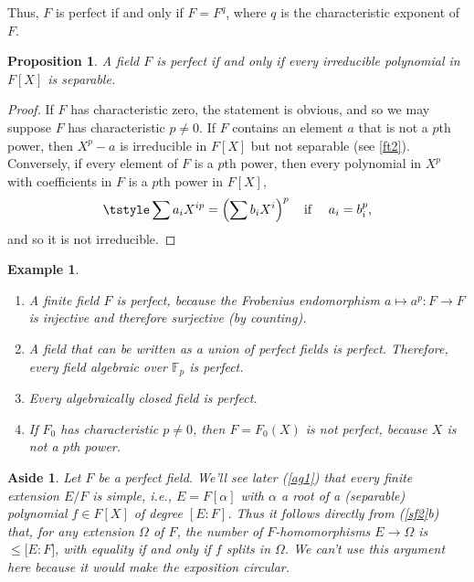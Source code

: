 \documentclass[a4paper,11pt,final,openany]{memoir}
\newtheorem{proposition}[X]{Proposition}
\newtheorem{example}[X]{Example}
\newtheorem{aside}[X]{Aside}
\theoremstyle{nonumberplain}
\newtheorem{proof}{Proof.}
\begin{document}
Thus, $F$ is perfect if and only if $F=F^{q}$, where $q$ is the characteristic
exponent of $F$.

\begin{proposition}
\label{ft5}A field $F$ is perfect if and only if every irreducible polynomial
in $F[X]$ is separable.
\end{proposition}

\begin{proof}
If $F$ has characteristic zero, the statement is obvious, and so we may
suppose $F$ has characteristic $p\neq0$. If $F$ contains an element $a$ that
is not a $p$th power, then $X^{p}-a$ is irreducible in $F[X]$ but not
separable (see \ref{ft2}). Conversely, if every element of $F$ is a $p$th
power, then every polynomial in $X^{p}$ with coefficients in $F$ is a $p$th
power in $F[X]$,%
\[
\tstyle\sum a_{i}X^{ip}=\left(  \sum b_{i}X^{i}\right)  ^{p}\quad\text{if
}\quad a_{i}=b_{i}^{p}\text{,}%
\]
and so it is not irreducible.
\end{proof}

\begin{example}
\label{ft6}

\begin{enumerate}
\item A finite field $F$ is perfect, because the Frobenius endomorphism%
$a\mapsto a^{p}\colon F\rightarrow F$ is injective and therefore surjective
(by counting).

\item A field that can be written as a union of perfect fields is perfect.
Therefore, every field algebraic over $\mathbb{F}{}_{p}$ is perfect.

\item Every algebraically closed field is perfect.

\item If $F_{0}$ has characteristic $p\neq0$, then $F=F_{0}(X)$ is not
perfect, because $X$ is not a $p$th power.
\end{enumerate}
\end{example}

\begin{aside}
Let $F$ be a perfect field. We'll see later (\ref{ag1}) that every finite
extension $E/F$ is simple, i.e., $E=F[\alpha]$ with $\alpha$ a root of a
(separable) polynomial $f\in F[X]$ of degree $[E\colon F]$. Thus it follows
directly from (\ref{sf2}b) that, for any extension $\Omega$ of $F$, the number
of $F$-homomorphisms $E\rightarrow\Omega$ is $\leq\lbrack E\colon F]$, with
equality if and only if $f$ splits in $\Omega$. We can't use this argument
here because it would make the exposition circular.
\end{aside}
\end{document}
